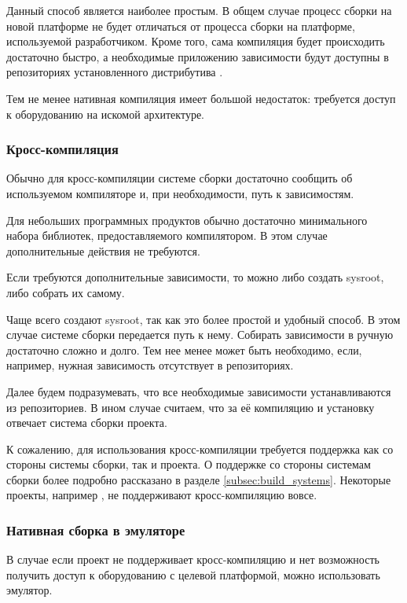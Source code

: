 Данный способ является наиболее простым.
В общем случае процесс сборки на новой платформе не будет отличаться от процесса сборки на платформе, используемой разработчиком.
Кроме того, сама компиляция будет происходить достаточно быстро, а необходимые приложению зависимости будут доступны в репозиториях установленного дистрибутива \linux{}.

Тем не менее нативная компиляция имеет большой недостаток: требуется доступ к оборудованию на искомой архитектуре.

\subsubsection{Кросс-компиляция}

Обычно для кросс-компиляции системе сборки достаточно сообщить об используемом компиляторе и, при необходимости, путь к зависимостям.

Для небольших программных продуктов обычно достаточно минимального набора библиотек, предоставляемого компилятором.
В этом случае дополнительные действия не требуются.

Если требуются дополнительные зависимости, то можно либо создать sysroot, либо собрать их самому.

Чаще всего создают sysroot, так как это более простой и удобный способ.
В этом случае системе сборки передается путь к нему.
Собирать зависимости в ручную достаточно сложно и долго.
Тем нее менее может быть необходимо, если, например, нужная зависимость отсутствует в репозиториях.

Далее будем подразумевать, что все необходимые зависимости устанавливаются из репозиториев.
В ином случае считаем, что за её компиляцию и установку отвечает система сборки проекта.

К сожалению, для использования кросс-компиляции требуется поддержка как со стороны системы сборки, так и проекта.
О поддержке со стороны системам сборки более подробно рассказано в разделе \ref{subsec:build_systems}.
Некоторые проекты, например \OCaml{}, не поддерживают кросс-компиляцию вовсе.

\subsubsection{Нативная сборка в эмуляторе}

В случае если проект не поддерживает кросс-компиляцию и нет возможность получить доступ к оборудованию с целевой платформой, можно использовать эмулятор.

